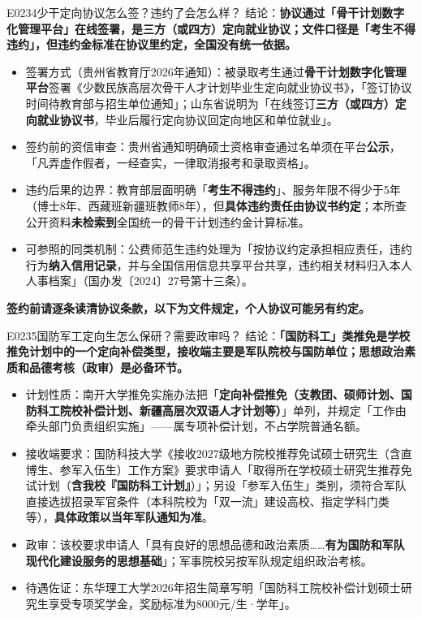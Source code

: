 \begin{qa}{E0234}{少干定向协议怎么签？违约了会怎么样？}
结论：\textbf{协议通过「骨干计划数字化管理平台」在线签署，是三方（或四方）定向就业协议；文件口径是「考生不得违约」，但违约金标准在协议里约定，全国没有统一依据。}
\begin{itemize}
  \item 签署方式（贵州省教育厅2026年通知）：被录取考生通过\textbf{骨干计划数字化管理平台}签署《少数民族高层次骨干人才计划毕业生定向就业协议书》，「签订协议时间待教育部与招生单位通知」；山东省说明为「在线签订\textbf{三方（或四方）定向就业协议书}，毕业后履行定向协议回定向地区和单位就业」。
  \item 签约前的资信审查：贵州省通知明确硕士资格审查通过名单须在平台\textbf{公示}，「凡弄虚作假者，一经查实，一律取消报考和录取资格」。
  \item 违约后果的边界：教育部层面明确「\textbf{考生不得违约}」、服务年限不得少于5年（博士8年、西藏班新疆班教师8年），但\textbf{具体违约责任由协议书约定}；本所查公开资料\textbf{未检索到}全国统一的骨干计划违约金计算标准。
  \item 可参照的同类机制：公费师范生违约处理为「按协议约定承担相应责任，违约行为\textbf{纳入信用记录}，并与全国信用信息共享平台共享，违约相关材料归入本人人事档案」（国办发〔2024〕27号第十三条）。
\end{itemize}
\textbf{签约前请逐条读清协议条款，以下为文件规定，个人协议可能另有约定。}
\end{qa}

\begin{qa}{E0235}{国防军工定向生怎么保研？需要政审吗？}
结论：\textbf{「国防科工」类推免是学校推免计划中的一个定向补偿类型，接收端主要是军队院校与国防单位；思想政治素质和品德考核（政审）是必备环节。}
\begin{itemize}
  \item 计划性质：南开大学推免实施办法把「\textbf{定向补偿推免（支教团、硕师计划、国防科工院校补偿计划、新疆高层次双语人才计划等）}」单列，并规定「工作由牵头部门负责组织实施」——属专项补偿计划，不占学院普通名额。
  \item 接收端要求：国防科技大学《接收2027级地方院校推荐免试硕士研究生（含直博生、参军入伍生）工作方案》要求申请人「取得所在学校硕士研究生推荐免试计划（\textbf{含我校『国防科工计划』}）」；另设「参军入伍生」类别，须符合军队直接选拔招录军官条件（本科院校为「双一流」建设高校、指定学科门类等），\textbf{具体政策以当年军队通知为准}。
  \item 政审：该校要求申请人「具有良好的思想品德和政治素质……\textbf{有为国防和军队现代化建设服务的思想基础}」；军事院校另按军队规定组织政治考核。
  \item 待遇佐证：东华理工大学2026年招生简章写明「国防科工院校补偿计划硕士研究生享受专项奖学金，奖励标准为8000元/生·学年」。
\end{itemize}
\end{qa}

